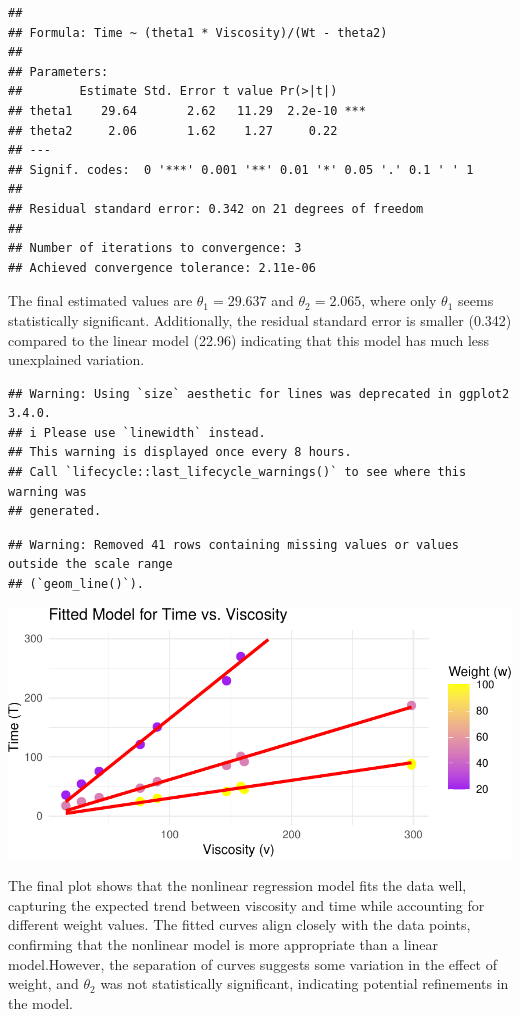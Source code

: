 \documentclass[
  11pt,
]{article}
\begin{document}
\begin{verbatim}
## 
## Formula: Time ~ (theta1 * Viscosity)/(Wt - theta2)
## 
## Parameters:
##        Estimate Std. Error t value Pr(>|t|)    
## theta1    29.64       2.62   11.29  2.2e-10 ***
## theta2     2.06       1.62    1.27     0.22    
## ---
## Signif. codes:  0 '***' 0.001 '**' 0.01 '*' 0.05 '.' 0.1 ' ' 1
## 
## Residual standard error: 0.342 on 21 degrees of freedom
## 
## Number of iterations to convergence: 3 
## Achieved convergence tolerance: 2.11e-06
\end{verbatim}

The final estimated values are \(\theta_1 = 29.637\) and
\(\theta_2 = 2.065\), where only \(\theta_1\) seems statistically
significant. Additionally, the residual standard error is smaller
(0.342) compared to the linear model (22.96) indicating that this model
has much less unexplained variation.

\begin{verbatim}
## Warning: Using `size` aesthetic for lines was deprecated in ggplot2 3.4.0.
## i Please use `linewidth` instead.
## This warning is displayed once every 8 hours.
## Call `lifecycle::last_lifecycle_warnings()` to see where this warning was
## generated.
\end{verbatim}

\begin{verbatim}
## Warning: Removed 41 rows containing missing values or values outside the scale range
## (`geom_line()`).
\end{verbatim}

\includegraphics{ReportAssignment2_files/figure-latex/unnamed-chunk-23-1.pdf}

The final plot shows that the nonlinear regression model fits the data
well, capturing the expected trend between viscosity and time while
accounting for different weight values. The fitted curves align closely
with the data points, confirming that the nonlinear model is more
appropriate than a linear model.However, the separation of curves
suggests some variation in the effect of weight, and \(\theta_2\) was
not statistically significant, indicating potential refinements in the
model.
\end{document}

